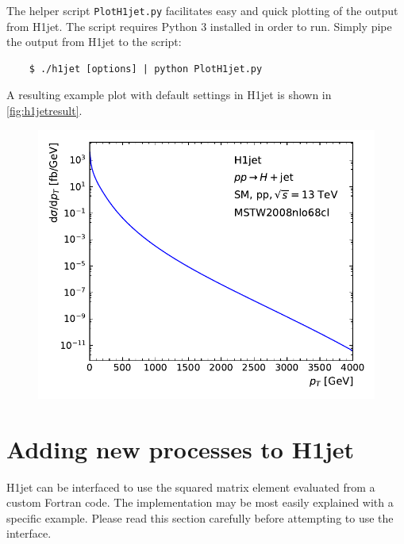 \documentclass[12pt,a4wide]{article}
\begin{document}
The helper script \texttt{PlotH1jet.py} facilitates easy and quick plotting of the output from H1jet. The script requires Python 3 installed in order to run. Simply pipe the output from H1jet to the script: 
\begin{lstlisting}
	$ ./h1jet [options] | python PlotH1jet.py 
\end{lstlisting}
A resulting example plot with default settings in H1jet is shown in \autoref{fig:h1jetresult}. 

\begin{figure}[tbh] 
  \centering
  \includegraphics[width=0.6\linewidth]{figures/h1jetresult}
  \label{fig:h1jetresult}
\end{figure}

\section{Adding new processes to H1jet} \label{sec:newprocs} 
H1jet can be interfaced to use the squared matrix element evaluated from a custom Fortran code. The implementation may be most easily explained with a specific example. Please read this section carefully before attempting to use the interface. 
\end{document}
